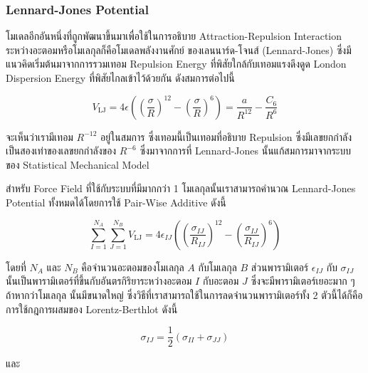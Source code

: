 \subsubsection{Lennard-Jones Potential}

โมเดลอีกอันหนึ่งที่ถูกพัฒนาขึ้นมาเพื่อใช้ในการอธิบาย Attraction-Repulsion Interaction ระหว่างอะตอมหรือโมเลกุลก็คือโมเดลพลังงานศักย์%
ของเลนนาร์ด-โจนส์ (Lennard-Jones) ซึ่งมีแนวคิดเริ่มต้นมาจากการรวมเทอม Repulsion Energy ที่พิสัยใกล้กับเทอมแรงดึงดูด London
Dispersion Energy ที่พิสัยไกลเข้าไว้ด้วยกัน ดังสมการต่อไปนี้

\begin{equation}
  V_{\text{LJ}}
  =
  4 \epsilon
  \left(
  \left(
    \frac{\sigma}{R}
    \right)^{12}
  -
  \left(
    \frac{\sigma}{R}
    \right)^{6}
  \right)
  =
  \frac{a}{R^{12}}
  - \frac{C_{6}}{R^{6}}
\end{equation}

\noindent จะเห็นว่าเรามีเทอม $R^{-12}$ อยู่ในสมการ ซึ่งเทอมนี้เป็นเทอมที่อธิบาย Repulsion ซึ่งมีเลขยกกำลังเป็นสองเท่าของเลขยกกำลังของ
$R^{-6}$ ซึ่งมาจากการที่ Lennard-Jones นั้นแก้สมการมาจากระบบของ Statistical Mechanical Model

สำหรับ Force Field ที่ใช้กับระบบที่มีมากกว่า 1 โมเลกุลนั้นเราสามารถคำนวณ Lennard-Jones Potential ทั้งหมดได้โดยการใช้ Pair-Wise
Additive ดังนี้

\begin{equation}
  \sum^{N_{A}}_{I=1}
  \sum^{N_{B}}_{J=1}
  V_{\text{LJ}}
  =
  4 \epsilon_{IJ}
  \left(
  \left(
    \frac{\sigma_{IJ}}{R_{IJ}}
    \right)^{12}
  -
  \left(
    \frac{\sigma_{IJ}}{R_{IJ}}
    \right)^{6}
  \right)
\end{equation}

\noindent โดยที่ $N_{A}$ และ $N_{B}$ คือจำนวนอะตอมของโมเลกุล $A$ กับโมเลกุล $B$ ส่วนพารามิเตอร์ $\epsilon_{IJ}$ กับ
$\sigma_{IJ}$ นั้นเป็นพารามิเตอร์ที่ขึ้นกับอันตรกิริยาระหว่างอะตอม $I$ กับอะตอม $J$ ซึ่งจะมีพารามิเตอร์เยอะมาก ๆ ถ้าหากว่าโมเลกุล%
นั้นมีขนาดใหญ่ ซึ่งวิธีที่เราสามารถใช้ในการลดจำนวนพารามิเตอร์ทั้ง 2 ตัวนี้ได้ก็คือการใช้กฎการผสมของ Lorentz-Berthlot ดังนี้

\begin{equation}
  \sigma_{IJ}
  =
  \frac{1}{2}
  (\sigma_{II}
  + \sigma_{JJ})
\end{equation}

\noindent และ

